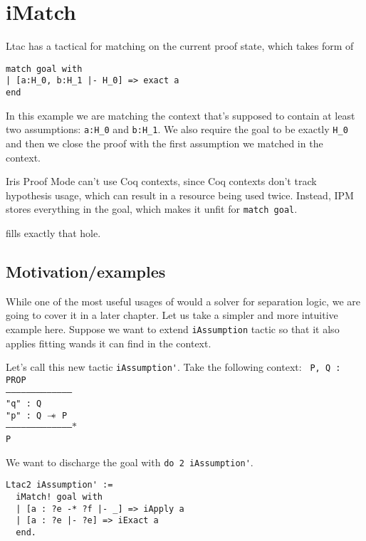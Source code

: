 \chapter{iMatch}

Ltac has a tactical for matching on the current proof state, which takes form of

\begin{lstlisting}[language=caml]
match goal with
| [a:H_0, b:H_1 |- H_0] => exact a
end
\end{lstlisting}

In this example we are matching the context that's supposed to contain at least two assumptions: \verb|a:H_0| and \verb|b:H_1|.
We also require the goal to be exactly \verb|H_0| and then we close the proof with the first assumption we matched in the context.\

Iris Proof Mode can't use Coq contexts, since Coq contexts don't track hypothesis usage, which can result in a resource being used twice.
Instead, IPM stores everything in the goal, which makes it unfit for \verb|match goal|.

\iMatch fills exactly that hole.

\section{Motivation/examples}

While one of the most useful usages of \iMatch would a solver for separation logic, we are going to cover it in a later chapter.
Let us take a simpler and more intuitive example here.
Suppose we want to extend \verb|iAssumption| tactic so that it also applies fitting wands it can find in the context.

Let's call this new tactic \verb|iAssumption'|.
Take the following context:
\texttt{
P, Q : PROP\\
---------------------------------------\\
"q" : Q\\
"p" : Q $\mathrel{-\mkern-6mu*}$ P\\
--------------------------------------$\ast$\\
P
}

We want to discharge the goal with \verb|do 2 iAssumption'|.

\begin{lstlisting}[language=caml]
Ltac2 iAssumption' :=
  iMatch! goal with
  | [a : ?e -* ?f |- _] => iApply a
  | [a : ?e |- ?e] => iExact a
  end.
\end{lstlisting}

